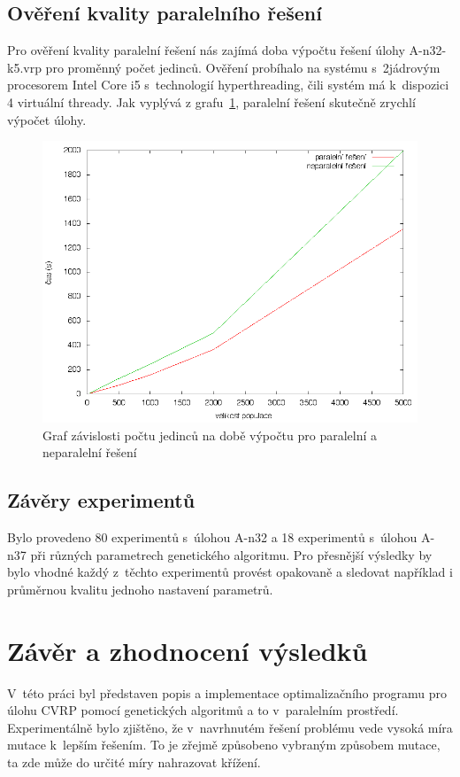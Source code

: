 \documentclass[a4paper]{article}
\begin{document}
\subsection{Ověření kvality paralelního řešení}

Pro ověření kvality paralelní řešení nás zajímá doba výpočtu řešení úlohy A-n32-k5.vrp pro proměnný počet jedinců. Ověření probíhalo na systému s~2jádrovým procesorem Intel Core i5 s~technologií hyperthreading, čili systém má k~dispozici 4 virtuální thready. Jak vyplývá z grafu~\ref{fig:procesory}, paralelní řešení skutečně zrychlí výpočet úlohy.

\begin{figure}
\centering
\includegraphics[width=\textwidth]{procesory.png}
\caption{Graf závislosti počtu jedinců na době výpočtu pro paralelní a neparalelní řešení\label{fig:procesory}}
\end{figure}

\subsection{Závěry experimentů}
Bylo provedeno 80 experimentů s~úlohou A-n32 a 18 experimentů s~úlohou A-n37 při různých parametrech genetického algoritmu. Pro přesnější výsledky by bylo vhodné každý z~těchto experimentů provést opakovaně a sledovat například i průměrnou kvalitu jednoho nastavení parametrů.

\section{Závěr a zhodnocení výsledků}
V~této práci byl představen popis a implementace optimalizačního programu pro úlohu CVRP pomocí genetických algoritmů a to v~paralelním prostředí. Experimentálně bylo zjištěno, že v~navrhnutém řešení problému vede vysoká míra mutace k~lepším řešením. To je zřejmě způsobeno vybraným způsobem mutace, ta zde může do určité míry nahrazovat křížení.
\end{document}
